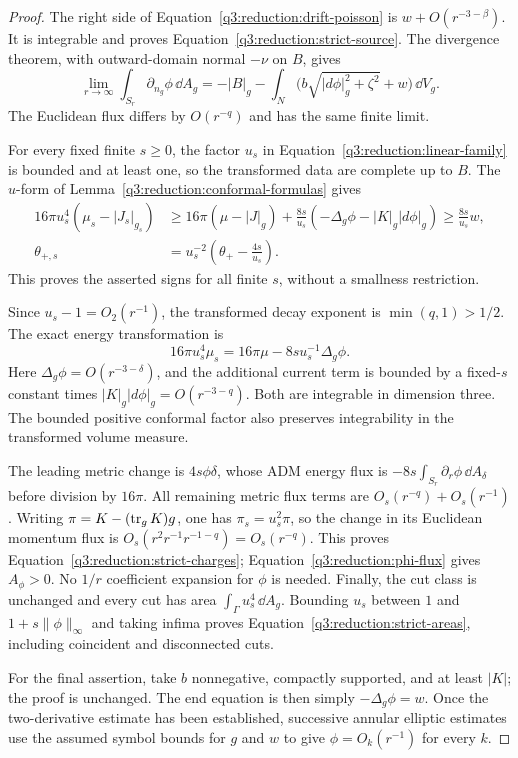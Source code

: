 \begin{proof}
The right side of Equation~\eqref{q3:reduction:drift-poisson} is
$w+O(r^{-3-\beta})$.  It is integrable and proves
Equation~\eqref{q3:reduction:strict-source}.  The divergence theorem, with
outward-domain normal $-\nu$ on $B$, gives
\begin{equation}
 \label{q3:reduction:phi-flux}
 \lim_{r\to\infty}\int_{S_r}\partial_{n_g}\phi\,\dd A_g
 =-|B|_g-\int_N
       \bigl(b\sqrt{|d\phi|_g^2+\zeta^2}+w\bigr)\,\dd V_g.
\end{equation}
The Euclidean flux differs by $O(r^{-q})$ and has the same finite limit.

For every fixed finite $s\ge0$, the factor $u_s$ in
Equation~\eqref{q3:reduction:linear-family} is bounded and at least one,
so the transformed data are complete up to $B$.
The $u$-form of Lemma~\ref{q3:reduction:conformal-formulas} gives
\begin{align*}
 16\pi u_s^4(\mu_s-|J_s|_{g_s})
 &\ge16\pi(\mu-|J|_g)
        +\frac{8s}{u_s}(-\Delta_g\phi-|K|_g|d\phi|_g)
 \ge \frac{8s}{u_s}w,\\
 \theta_{+,s}
 &=u_s^{-2}\left(\theta_+-\frac{4s}{u_s}\right).
\end{align*}
This proves the asserted signs for all finite $s$, without a smallness
restriction.

Since $u_s-1=O_2(r^{-1})$, the transformed decay exponent is
$\min(q,1)>1/2$.  The exact energy transformation is
\[
 16\pi u_s^4\mu_s=16\pi\mu-8s u_s^{-1}\Delta_g\phi.
\]
Here $\Delta_g\phi=O(r^{-3-\delta})$, and the additional current term
is bounded by a fixed-$s$ constant times
$|K|_g|d\phi|_g=O(r^{-3-q})$.  Both are integrable in dimension three.
The bounded positive conformal factor also preserves integrability in
the transformed volume measure.

The leading metric change is $4s\phi\delta$, whose ADM energy flux
is $-8s\int_{S_r}\partial_r\phi\,\dd A_\delta$ before division by
$16\pi$.  All remaining metric flux terms are
$O_s(r^{-q})+O_s(r^{-1})$.  Writing $\pi=K-(\operatorname{tr}_gK)g$, one has
$\pi_s=u_s^2\pi$, so the change in its Euclidean momentum flux is
$O_s(r^2r^{-1}r^{-1-q})=O_s(r^{-q})$.
This proves Equation~\eqref{q3:reduction:strict-charges};
Equation~\eqref{q3:reduction:phi-flux} gives $A_\phi>0$.
No $1/r$ coefficient expansion for $\phi$ is needed.
Finally, the cut class is unchanged and every cut has area
$\int_\Gamma u_s^4\,\dd A_g$.  Bounding $u_s$ between $1$ and
$1+s\|\phi\|_\infty$ and taking infima proves
Equation~\eqref{q3:reduction:strict-areas}, including coincident and
disconnected cuts.

For the final assertion, take $b$ nonnegative, compactly supported, and
at least $|K|$; the proof is unchanged.  The end equation is then simply
$-\Delta_g\phi=w$.  Once the two-derivative estimate has been established,
successive annular elliptic estimates use the assumed symbol bounds for
$g$ and $w$ to give $\phi=O_k(r^{-1})$ for every $k$.
\end{proof}

